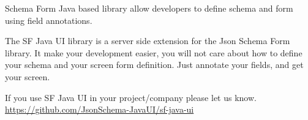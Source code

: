\documentclass[10pt,a4paper]{altacv}
\begin{document}
\clearpage

Schema Form Java based library allow developers to define schema and form using field annotations.

The SF Java UI library is a server side extension for the Json Schema Form library. It make your development easier, you will not care about how to define your schema and your screen form definition. Just annotate your fields, and get your screen.

If you use SF Java UI in your project/company please let us know.
\url{https://github.com/JsonSchema-JavaUI/sf-java-ui}


\divider



\end{document}
